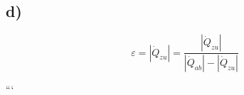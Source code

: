 

\subsection*{d)}

\[
\varepsilon = \left| \dot{Q}_{zu} \right| = \frac{\left| \dot{Q}_{zu} \right|}{\left| \dot{Q}_{ab} \right| - \left| \dot{Q}_{zu} \right|}
\]

```
